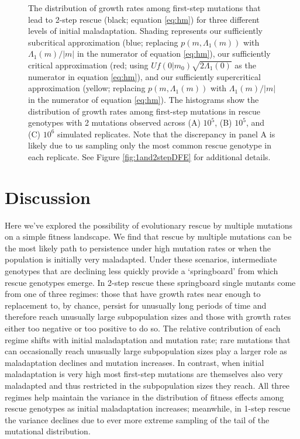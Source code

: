 \documentclass[9pt,twocolumn,twoside,lineno]{gsajnl}
\begin{document}
\begin{figure}[htbp]
\caption{
The distribution of growth rates among first-step mutations that lead to 2-step rescue (black; equation \ref{eq:hm}) for three different levels of initial maladaptation.
Shading represents our sufficiently subcritical approximation (blue; replacing $p(m,\Lambda_1(m))$ with $\Lambda_1(m)/|m|$ in the numerator of equation \ref{eq:hm}), our sufficiently critical approximation (red; using $U f(0|m_0) \sqrt{2 \Lambda_1(0)}$ as the numerator in equation \ref{eq:hm}), and our sufficiently supercritical approximation (yellow; replacing $p(m,\Lambda_1(m))$ with $\Lambda_1(m)/|m|$ in the numerator of equation \ref{eq:hm}).
The histograms show the distribution of growth rates among first-step mutations in rescue genotypes with 2 mutations observed across (A) $10^5$, (B) $10^5$, and (C) $10^6$ simulated replicates.
Note that the discrepancy in panel A is likely due to us sampling only the most common rescue genotype in each replicate.
See Figure \ref{fig:1and2stepDFE} for additional details.
}%
\label{fig:2stepDFE}
\end{figure}

\section{Discussion}
\label{sec:discussion}

Here we've explored the possibility of evolutionary rescue by multiple mutations on a simple fitness landscape. 
We find that rescue by multiple mutations can be the most likely path to persistence under high mutation rates or when the population is initially very maladapted.
Under these scenarios, intermediate genotypes that are declining less quickly provide a `springboard' from which rescue genotypes emerge.
In 2-step rescue these springboard single mutants come from one of three regimes: those that have growth rates near enough to replacement to, by chance, persist for unusually long periods of time and therefore reach unusually large subpopulation sizes and those with growth rates either too negative or too positive to do so.
The relative contribution of each regime shifts with initial maladaptation and mutation rate; rare mutations that can occasionally reach unusually large subpopulation sizes play a larger role as maladaptation declines and mutation increases.
In contrast, when initial maladaptation is very high most first-step mutations are themselves also very maladapted and thus restricted in the subpopulation sizes they reach.       
All three regimes help maintain the variance in the distribution of fitness effects among rescue genotypes as initial maladaptation increases; meanwhile, in 1-step rescue the variance declines due to ever more extreme sampling of the tail of the mutational distribution.
\end{document}
